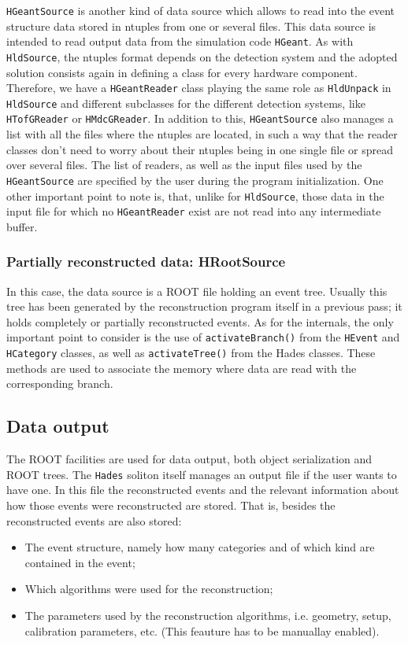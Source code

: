 \verb+HGeantSource+ is another kind of data source which allows to read into the 
event structure data stored in ntuples from one or several files. This data source 
is intended to read output data from the simulation code \verb+HGeant+.
As with \verb+HldSource+, the ntuples format depends on the detection system and 
the adopted solution consists again in defining a class for every hardware component. 
Therefore, we have a \verb+HGeantReader+ class playing the same role as \verb+HldUnpack+ 
in \verb+HldSource+ and different subclasses for the different detection systems, like 
\verb+HTofGReader+ or \verb+HMdcGReader+.
In addition to this, \verb+HGeantSource+ also manages a list with all the files where 
the ntuples are located, in such a way that the reader classes don't need to worry 
about their ntuples being in one single file or spread over several files.
The list of readers, as well as the input files used by the \verb+HGeantSource+ are 
specified by the user during the program initialization. One other important point 
to note is, that, unlike for \verb+HldSource+, those data in the input file for 
which no \verb+HGeantReader+ exist are not read into any intermediate buffer. 

\subsubsection{Partially reconstructed data: HRootSource}

In this case, the data source is a ROOT file holding an event tree. Usually this tree 
has been generated by the reconstruction program itself in a previous pass; it holds 
completely or partially reconstructed events. As for the internals, the only important 
point to consider is the use of \verb+activateBranch()+ from the \verb+HEvent+ and 
\verb+HCategory+ classes, as well as \verb+activateTree()+ from the Hades classes. 
These methods are used to associate the memory where data are read with the 
corresponding branch.







\subsection{Data output}

The ROOT facilities are used for data output, both object serialization and ROOT trees.
The \verb+Hades+ soliton itself manages an output file if the user wants to have one. 
In this file the reconstructed events and the relevant information about how those 
events were reconstructed are stored. That is, besides the reconstructed events are 
also stored:
\begin{itemize}
    \item The event structure, namely how many categories and of which kind are contained 
    in the event;
    \item Which algorithms were used for the reconstruction;
    \item The parameters used by the reconstruction algorithms, i.e. geometry, setup, 
    calibration parameters, etc. (This feauture has to be manuallay enabled). 
\end{itemize}

